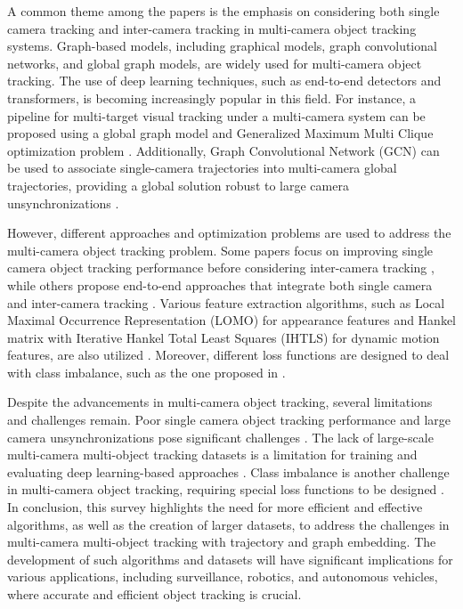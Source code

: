 \documentclass[conference]{IEEEtran}
\begin{document}
A common theme among the papers is the emphasis on considering both single camera tracking and inter-camera tracking in multi-camera object tracking systems. Graph-based models, including graphical models, graph convolutional networks, and global graph models, are widely used for multi-camera object tracking. The use of deep learning techniques, such as end-to-end detectors and transformers, is becoming increasingly popular in this field. For instance, a pipeline for multi-target visual tracking under a multi-camera system can be proposed using a global graph model and Generalized Maximum Multi Clique optimization problem \cite{Multi-camera Multi-Object Tracking}. Additionally, Graph Convolutional Network (GCN) can be used to associate single-camera trajectories into multi-camera global trajectories, providing a global solution robust to large camera unsynchronizations \cite{Graph Convolutional Network for Multi-Target Multi-Camera Vehicle Tracking}.

However, different approaches and optimization problems are used to address the multi-camera object tracking problem. Some papers focus on improving single camera object tracking performance before considering inter-camera tracking \cite{An equalised global graphical model-based approach for multi-camera object tracking}, while others propose end-to-end approaches that integrate both single camera and inter-camera tracking \cite{MCTR: Multi Camera Tracking Transformer}. Various feature extraction algorithms, such as Local Maximal Occurrence Representation (LOMO) for appearance features and Hankel matrix with Iterative Hankel Total Least Squares (IHTLS) for dynamic motion features, are also utilized \cite{Multi-camera Multi-Object Tracking}. Moreover, different loss functions are designed to deal with class imbalance, such as the one proposed in \cite{Graph Convolutional Network for Multi-Target Multi-Camera Vehicle Tracking}.

Despite the advancements in multi-camera object tracking, several limitations and challenges remain. Poor single camera object tracking performance and large camera unsynchronizations pose significant challenges \cite{Challenge of Multi-Camera Tracking}. The lack of large-scale multi-camera multi-object tracking datasets is a limitation for training and evaluating deep learning-based approaches \cite{MCTR: Multi Camera Tracking Transformer}. Class imbalance is another challenge in multi-camera object tracking, requiring special loss functions to be designed \cite{Graph Convolutional Network for Multi-Target Multi-Camera Vehicle Tracking}. In conclusion, this survey highlights the need for more efficient and effective algorithms, as well as the creation of larger datasets, to address the challenges in multi-camera multi-object tracking with trajectory and graph embedding. The development of such algorithms and datasets will have significant implications for various applications, including surveillance, robotics, and autonomous vehicles, where accurate and efficient object tracking is crucial.
\end{document}
